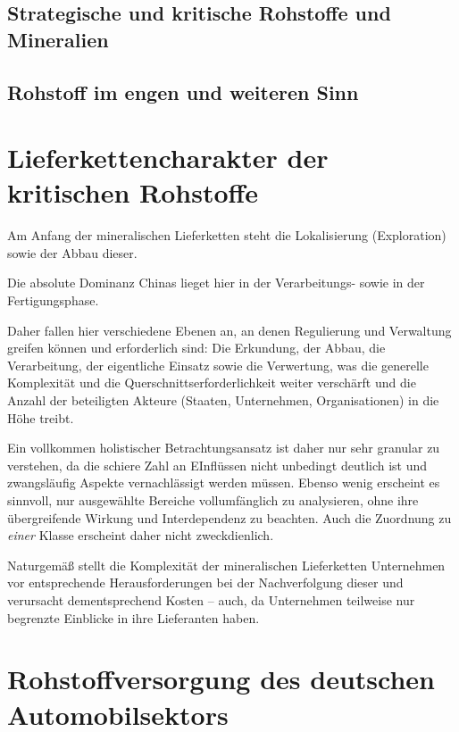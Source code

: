 \documentclass[12pt,a4paper,oneside]{book} %
\begin{document}
	\subsection{Strategische und kritische Rohstoffe und Mineralien}
	
	\subsection{Rohstoff im engen und weiteren Sinn}
	
	\section{Lieferkettencharakter der kritischen Rohstoffe}
	
	Am Anfang der mineralischen Lieferketten steht die Lokalisierung (Exploration) sowie der Abbau dieser.
	
	
	
	Die absolute Dominanz Chinas lieget hier in der Verarbeitungs- sowie in der Fertigungsphase.
	
	
	
	Daher fallen hier verschiedene Ebenen an, an denen Regulierung und Verwaltung greifen können und erforderlich sind: Die Erkundung, der Abbau, die Verarbeitung, der eigentliche Einsatz sowie die Verwertung, was die generelle Komplexität und die Querschnittserforderlichkeit weiter verschärft und die Anzahl der beteiligten Akteure (Staaten, Unternehmen, Organisationen) in die Höhe treibt.
	
	Ein vollkommen holistischer Betrachtungsansatz ist daher nur sehr granular zu verstehen, da die schiere Zahl an EInflüssen nicht unbedingt deutlich ist und zwangsläufig Aspekte vernachlässigt werden müssen. Ebenso wenig erscheint es sinnvoll, nur ausgewählte Bereiche vollumfänglich zu analysieren, ohne ihre übergreifende Wirkung und Interdependenz zu beachten. Auch die Zuordnung zu \textit{einer} Klasse erscheint daher nicht zweckdienlich.
	
	Naturgemäß stellt die Komplexität der mineralischen Lieferketten Unternehmen vor entsprechende Herausforderungen bei der Nachverfolgung dieser und verursacht dementsprechend Kosten -- auch, da Unternehmen teilweise nur begrenzte Einblicke in ihre Lieferanten haben.\autocite{Jumping the Chain: How Downstream Manufacturers Engage with Deep Suppliers of Conflict Minerals}
	
	\section{Rohstoffversorgung des deutschen Automobilsektors}
	
\end{document}
